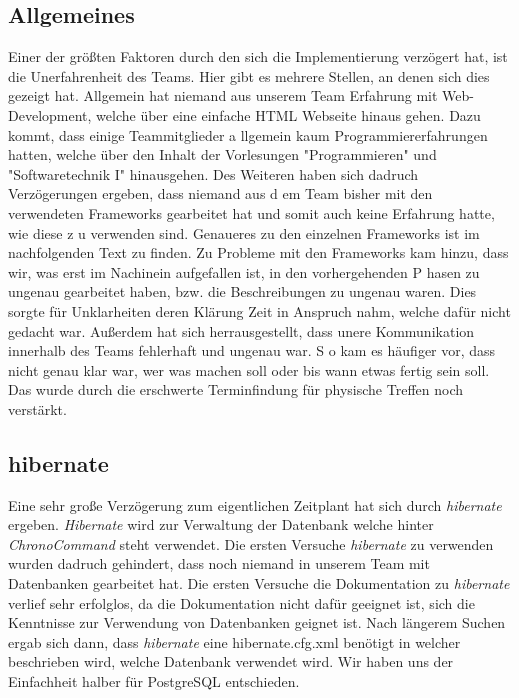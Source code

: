 \subsection{Allgemeines}
Einer der größten Faktoren durch den sich die Implementierung verzögert hat, ist die Unerfahrenheit des Teams. 
Hier gibt es mehrere Stellen, an denen sich dies gezeigt hat. Allgemein hat niemand aus unserem Team Erfahrung 
mit Web-Development, welche über eine einfache HTML Webseite hinaus gehen. Dazu kommt, dass einige Teammitglieder a
llgemein kaum Programmiererfahrungen hatten, welche über den Inhalt der Vorlesungen "Programmieren" und 
"Softwaretechnik I" hinausgehen. Des Weiteren haben sich dadruch Verzögerungen ergeben, dass niemand aus d
em Team bisher mit den verwendeten Frameworks gearbeitet hat und somit auch keine Erfahrung hatte, wie diese z
u verwenden sind. Genaueres zu den einzelnen Frameworks ist im nachfolgenden Text zu finden. 
Zu Probleme mit den Frameworks kam hinzu, dass wir, was erst im Nachinein aufgefallen ist, in den vorhergehenden P
hasen zu ungenau gearbeitet haben, bzw. die Beschreibungen zu ungenau waren. Dies sorgte für Unklarheiten deren 
Klärung Zeit in Anspruch nahm, welche dafür nicht gedacht war.
Außerdem hat sich herrausgestellt, dass unere Kommunikation innerhalb des Teams fehlerhaft und ungenau war. S
o kam es häufiger vor, dass nicht genau klar war, wer was machen soll oder bis wann etwas fertig sein soll. 
Das wurde durch die erschwerte Terminfindung für physische Treffen noch verstärkt. 





\subsection{hibernate}
Eine sehr große Verzögerung zum eigentlichen Zeitplant hat sich durch \emph{hibernate} ergeben. \emph{Hibernate} wird zur Verwaltung der
Datenbank welche hinter \emph{ChronoCommand} steht verwendet. Die ersten Versuche \emph{hibernate} zu verwenden wurden dadruch
gehindert, dass noch niemand in unserem Team mit Datenbanken gearbeitet hat. Die ersten Versuche die Dokumentation zu 
\emph{hibernate} verlief sehr erfolglos, da die Dokumentation nicht dafür geeignet ist, sich die Kenntnisse zur Verwendung von
Datenbanken geignet ist. Nach längerem Suchen ergab sich dann, dass \emph{hibernate} eine hibernate.cfg.xml benötigt in welcher 
beschrieben wird, welche Datenbank verwendet wird. Wir haben uns der Einfachheit halber für PostgreSQL entschieden. 


